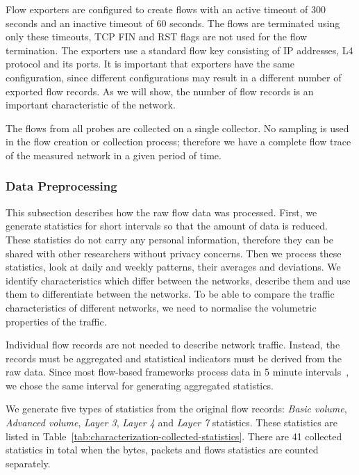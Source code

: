 Flow exporters are configured to create flows with an active timeout of 300 seconds and an inactive timeout of 60 seconds. The flows are terminated using only these timeouts, TCP FIN and RST flags are not used for the flow termination. The exporters use a standard flow key consisting of IP addresses, L4 protocol and its ports. It is important that exporters have the same configuration, since different configurations may result in a different number of exported flow records. As we will show, the number of flow records is an important characteristic of the network.

The flows from all probes are collected on a single collector. No sampling is used in the flow creation or collection process; therefore we have a complete flow trace of the measured network in a given period of time.


\subsubsection{Data Preprocessing}

This subsection describes how the raw flow data was processed. First, we generate statistics for short intervals so that the amount of data is reduced. These statistics do not carry any personal information, therefore they can be shared with other researchers without privacy concerns. Then we process these statistics, look at daily and weekly patterns, their averages and deviations. We identify characteristics which differ between the networks, describe them and use them to differentiate between the networks. To be able to compare the traffic characteristics of different networks, we need to normalise the volumetric properties of the traffic.

Individual flow records are not needed to describe network traffic. Instead, the records must be aggregated and statistical indicators must be derived from the raw data. Since most flow-based frameworks process data in 5 minute intervals~\cite{Haag-2011-NfSen}, we chose the same interval for generating aggregated statistics.

We generate five types of statistics from the original flow records: \emph{Basic volume}, \emph{Advanced volume}, \emph{Layer 3}, \emph{Layer 4} and \emph{Layer 7} statistics. These statistics are listed in Table~\ref{tab:characterization-collected-statistics}. There are 41 collected statistics in total when the bytes, packets and flows statistics are counted separately. 

